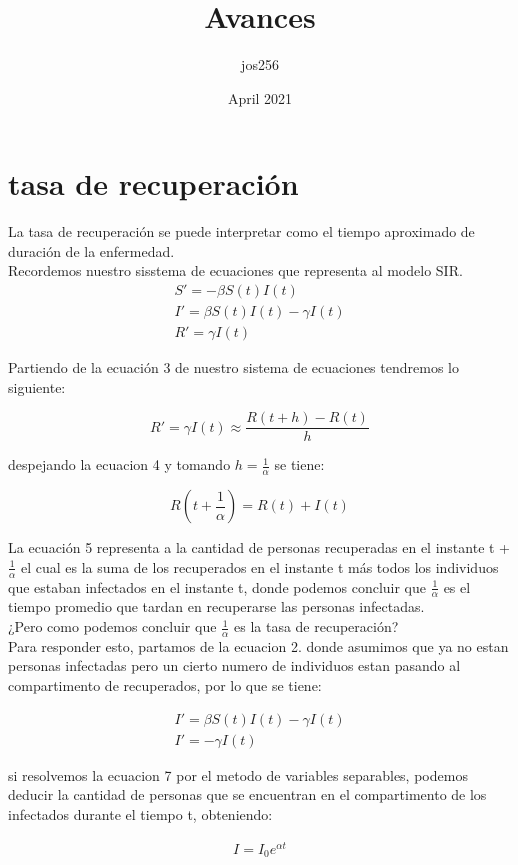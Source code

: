 \documentclass[a4paper,openany,12pt]{book}
\title{Avances}
\author{jos256 }
\date{April 2021}
\begin{document}
\section*{tasa de recuperación}
La tasa de recuperación se puede interpretar como el tiempo aproximado de duración de la enfermedad.\\

Recordemos nuestro sisstema de ecuaciones que representa al modelo SIR.\\

\begin{align}
S' = -\beta S\left(t\right)I\left(t\right)\\			
I' = \beta S\left(t\right)I\left(t\right) - \gamma I\left(t\right)\\		
R' = \gamma I\left(t\right)
\end{align}


Partiendo de la ecuación 3 de nuestro sistema de ecuaciones tendremos lo siguiente:

\begin{equation}
R' = \gamma I\left(t\right) \approx \frac{R(t+h) - R(t)}{h}
\end{equation}

despejando la ecuacion 4 y tomando $h = \frac{1}{\alpha}$ se tiene:

\begin{equation}
R(t+\frac{1}{\alpha}) = R(t) + I(t)
\end{equation}

La ecuación 5 representa a la cantidad de personas recuperadas en el instante t + $\frac{1}{\alpha}$ el cual es la suma de los recuperados en el instante t más todos los individuos que estaban infectados en el instante t, donde podemos concluir que $\frac{1}{\alpha}$ es el tiempo promedio que tardan en recuperarse las personas infectadas.\\

¿Pero como podemos concluir que $\frac{1}{\alpha}$ es la tasa de recuperación?\\
Para responder esto, partamos de la ecuacion 2. donde asumimos que ya no estan personas infectadas pero un cierto numero de individuos estan pasando al compartimento de recuperados, por lo que se tiene:

\begin{align}
I' = \beta S\left(t\right)I\left(t\right) - \gamma I\left(t\right)\\	
I' = - \gamma I\left(t\right)
\end{align}


si resolvemos la ecuacion 7 por el metodo de variables separables, podemos deducir la cantidad de personas que se encuentran en el compartimento de los infectados durante el tiempo t, obteniendo:


\begin{align}
I = I_{0}e^{\alpha t}
\end{align}
\end{document}
